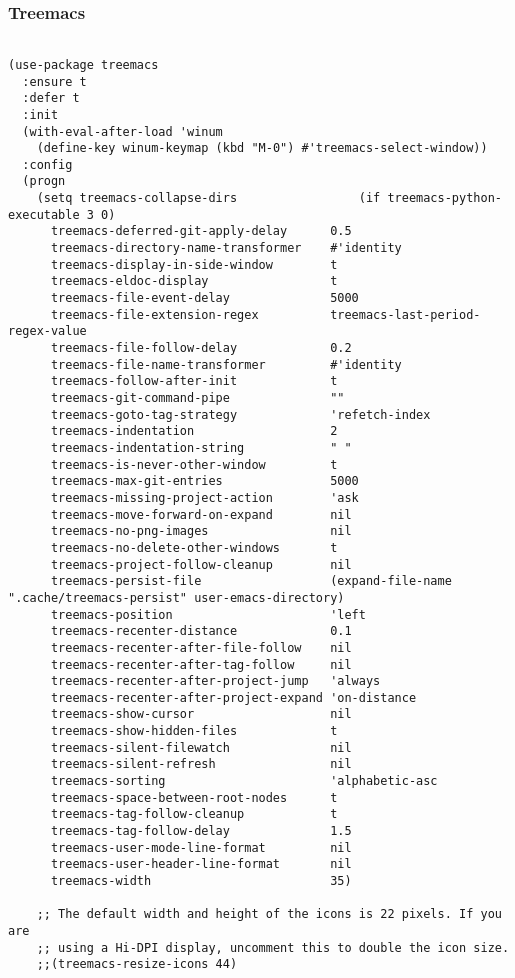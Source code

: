 \documentclass[11pt]{article}
\begin{document}
\subsubsection{Treemacs}
\label{sec:org776fdb5}
\begin{verbatim}

(use-package treemacs
  :ensure t
  :defer t
  :init
  (with-eval-after-load 'winum
    (define-key winum-keymap (kbd "M-0") #'treemacs-select-window))
  :config
  (progn
    (setq treemacs-collapse-dirs                 (if treemacs-python-executable 3 0)
	  treemacs-deferred-git-apply-delay      0.5
	  treemacs-directory-name-transformer    #'identity
	  treemacs-display-in-side-window        t
	  treemacs-eldoc-display                 t
	  treemacs-file-event-delay              5000
	  treemacs-file-extension-regex          treemacs-last-period-regex-value
	  treemacs-file-follow-delay             0.2
	  treemacs-file-name-transformer         #'identity
	  treemacs-follow-after-init             t
	  treemacs-git-command-pipe              ""
	  treemacs-goto-tag-strategy             'refetch-index
	  treemacs-indentation                   2
	  treemacs-indentation-string            " "
	  treemacs-is-never-other-window         t
	  treemacs-max-git-entries               5000
	  treemacs-missing-project-action        'ask
	  treemacs-move-forward-on-expand        nil
	  treemacs-no-png-images                 nil
	  treemacs-no-delete-other-windows       t
	  treemacs-project-follow-cleanup        nil
	  treemacs-persist-file                  (expand-file-name ".cache/treemacs-persist" user-emacs-directory)
	  treemacs-position                      'left
	  treemacs-recenter-distance             0.1
	  treemacs-recenter-after-file-follow    nil
	  treemacs-recenter-after-tag-follow     nil
	  treemacs-recenter-after-project-jump   'always
	  treemacs-recenter-after-project-expand 'on-distance
	  treemacs-show-cursor                   nil
	  treemacs-show-hidden-files             t
	  treemacs-silent-filewatch              nil
	  treemacs-silent-refresh                nil
	  treemacs-sorting                       'alphabetic-asc
	  treemacs-space-between-root-nodes      t
	  treemacs-tag-follow-cleanup            t
	  treemacs-tag-follow-delay              1.5
	  treemacs-user-mode-line-format         nil
	  treemacs-user-header-line-format       nil
	  treemacs-width                         35)

    ;; The default width and height of the icons is 22 pixels. If you are
    ;; using a Hi-DPI display, uncomment this to double the icon size.
    ;;(treemacs-resize-icons 44)


\end{verbatim}
\end{document}
